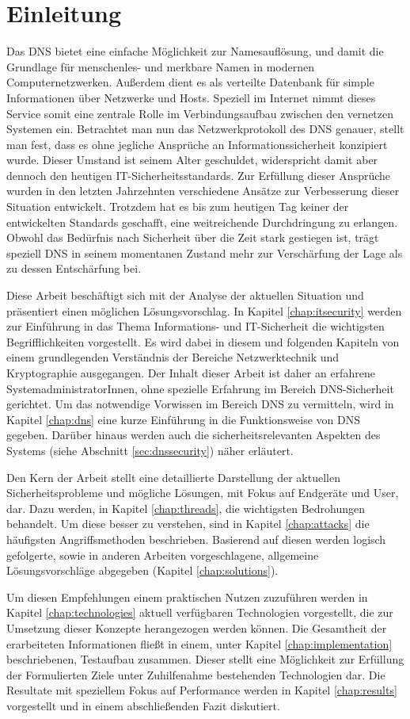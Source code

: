 \chapter{Einleitung}
Das \ac{DNS} bietet eine einfache Möglichkeit zur Namesauflösung, und damit die Grundlage für menschenles- und merkbare Namen in modernen Computernetzwerken. Außerdem dient es als verteilte Datenbank für simple Informationen über Netzwerke und Hosts. Speziell im Internet nimmt dieses Service somit eine zentrale Rolle im Verbindungsaufbau zwischen den vernetzen Systemen ein. Betrachtet man nun das Netzwerkprotokoll des DNS genauer, stellt man fest, dass es ohne jegliche Ansprüche an Informationssicherheit konzipiert wurde. Dieser Umstand ist seinem Alter geschuldet, widerspricht damit aber dennoch den heutigen IT-Sicherheitsstandards. Zur Erfüllung dieser Ansprüche wurden in den letzten Jahrzehnten verschiedene Ansätze zur Verbesserung dieser Situation entwickelt. Trotzdem hat es bis zum heutigen Tag keiner der entwickelten Standards geschafft, eine weitreichende Durchdringung zu erlangen. Obwohl das Bedürfnis nach Sicherheit über die Zeit stark gestiegen ist, trägt speziell DNS in seinem momentanen Zustand mehr zur Verschärfung der Lage als zu dessen Entschärfung bei.

Diese Arbeit beschäftigt sich mit der Analyse der aktuellen Situation und präsentiert einen möglichen Lösungsvorschlag. In Kapitel \ref{chap:itsecurity} werden zur Einführung in das Thema Informations- und IT-Sicherheit die wichtigsten Begrifflichkeiten vorgestellt. Es wird dabei in diesem und folgenden Kapiteln von einem grundlegenden Verständnis der Bereiche Netzwerktechnik und Kryptographie ausgegangen. Der Inhalt dieser Arbeit ist daher an erfahrene SystemadministratorInnen, ohne spezielle Erfahrung im Bereich DNS-Sicherheit gerichtet. Um das notwendige Vorwissen im Bereich DNS zu vermitteln, wird in Kapitel \ref{chap:dns} eine kurze Einführung in die Funktionsweise von DNS gegeben. Darüber hinaus werden auch die sicherheitsrelevanten Aspekten des Systems (siehe Abschnitt \ref{sec:dnssecurity}) näher erläutert. 

Den Kern der Arbeit stellt eine detaillierte Darstellung der aktuellen Sicherheitsprobleme und mögliche Lösungen, mit Fokus auf Endgeräte und User, dar. Dazu werden, in Kapitel \ref{chap:threads}, die wichtigsten Bedrohungen behandelt. Um diese besser zu verstehen, sind in Kapitel \ref{chap:attacks} die häufigsten Angriffsmethoden beschrieben. Basierend auf diesen werden logisch gefolgerte, sowie in anderen Arbeiten vorgeschlagene, allgemeine Lösungsvorschläge abgegeben (Kapitel \ref{chap:solutions}). 

Um diesen Empfehlungen einem praktischen Nutzen zuzuführen werden in Kapitel \ref{chap:technologies} aktuell verfügbaren Technologien vorgestellt, die zur Umsetzung dieser Konzepte herangezogen werden können. Die Gesamtheit der erarbeiteten Informationen fließt in einem, unter Kapitel \ref{chap:implementation} beschriebenen, Testaufbau zusammen. Dieser stellt eine Möglichkeit zur Erfüllung der Formulierten Ziele unter Zuhilfenahme bestehenden Technologien dar. Die Resultate mit speziellem Fokus auf Performance werden in Kapitel \ref{chap:results} vorgestellt und in einem abschließenden Fazit diskutiert.
